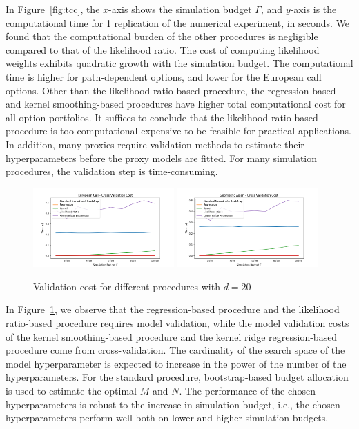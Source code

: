 \documentclass{article}
\begin{document}
In Figure~\ref{fig:tcc}, the $x$-axis shows the simulation budget $\Gamma$, and $y$-axis is the computational time for 1 replication of the numerical experiment, in seconds. 
We found that the computational burden of the other procedures is negligible compared to that of the likelihood ratio. The cost of computing likelihood weights exhibits quadratic growth with the simulation budget.
The computational time is higher for path-dependent options, and lower for the European call options. 
Other than the likelihood ratio-based procedure, the regression-based and kernel smoothing-based procedures have higher total computational cost for all option portfolios.
It suffices to conclude that the likelihood ratio-based procedure is too computational expensive to be feasible for practical applications.
In addition, many proxies require validation methods to estimate their hyperparameters before the proxy models are fitted.
For many simulation procedures, the validation step is time-consuming. 

\begin{figure}[ht!]
    \centering
    \includegraphics[width=0.48\textwidth]{./figures/time/European Call-Cross Validation Cost.png}
    \includegraphics[width=0.48\textwidth]{./figures/time/Geometric Asian-Cross Validation Cost.png}
    \caption{Validation cost for different procedures with $d=20$}
    \label{fig:vc20}
\end{figure}

In Figure~\ref{fig:vc20}, we observe that the regression-based procedure and the likelihood ratio-based procedure requires model validation, while the model validation costs of the kernel smoothing-based procedure and the kernel ridge regression-based procedure come from cross-validation. The cardinality of the search space of the model hyperparameter is expected to increase in the power of the number of the hyperparameters.
For the standard procedure, bootstrap-based budget allocation is used to estimate the optimal $M$ and $N$. The performance of the chosen hyperparameters is robust to the increase in simulation budget, i.e., the chosen hyperparameters perform well both on lower and higher simulation budgets.
\end{document}
